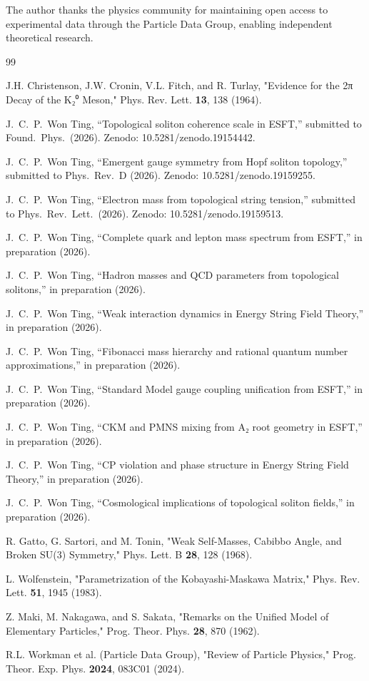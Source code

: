 ﻿\documentclass[prd,twocolumn,showpacs,superscriptaddress,groupedaddress]{revtex4-2}
\begin{document}
\begin{acknowledgments}
The author thanks the physics community for maintaining open access to experimental data through the Particle Data Group, enabling independent theoretical research.
\end{acknowledgments}

\begin{thebibliography}{99}

 J.H. Christenson, J.W. Cronin, V.L. Fitch, and R. Turlay, "Evidence for the 2π Decay of the K₂⁰ Meson," Phys. Rev. Lett. \textbf{13}, 138 (1964).

 J.~C.~P.~Won Ting, ``Topological soliton coherence scale in ESFT,'' submitted to Found.\ Phys.\ (2026). Zenodo: 10.5281/zenodo.19154442.

 J.~C.~P.~Won Ting, ``Emergent gauge symmetry from Hopf soliton topology,'' submitted to Phys.\ Rev.\ D (2026). Zenodo: 10.5281/zenodo.19159255.

 J.~C.~P.~Won Ting, ``Electron mass from topological string tension,'' submitted to Phys.\ Rev.\ Lett.\ (2026). Zenodo: 10.5281/zenodo.19159513.

 J.~C.~P.~Won Ting, ``Complete quark and lepton mass spectrum from ESFT,'' in preparation (2026).

 J.~C.~P.~Won Ting, ``Hadron masses and QCD parameters from topological solitons,'' in preparation (2026).

 J.~C.~P.~Won Ting, ``Weak interaction dynamics in Energy String Field Theory,'' in preparation (2026).

 J.~C.~P.~Won Ting, ``Fibonacci mass hierarchy and rational quantum number approximations,'' in preparation (2026).

 J.~C.~P.~Won Ting, ``Standard Model gauge coupling unification from ESFT,'' in preparation (2026).

 J.~C.~P.~Won Ting, ``CKM and PMNS mixing from A₂ root geometry in ESFT,'' in preparation (2026).

 J.~C.~P.~Won Ting, ``CP violation and phase structure in Energy String Field Theory,'' in preparation (2026).

 J.~C.~P.~Won Ting, ``Cosmological implications of topological soliton fields,'' in preparation (2026).

 R. Gatto, G. Sartori, and M. Tonin, "Weak Self-Masses, Cabibbo Angle, and Broken SU(3) Symmetry," Phys. Lett. B \textbf{28}, 128 (1968).

 L. Wolfenstein, "Parametrization of the Kobayashi-Maskawa Matrix," Phys. Rev. Lett. \textbf{51}, 1945 (1983).

 Z. Maki, M. Nakagawa, and S. Sakata, "Remarks on the Unified Model of Elementary Particles," Prog. Theor. Phys. \textbf{28}, 870 (1962).

 R.L. Workman et al. (Particle Data Group), "Review of Particle Physics," Prog. Theor. Exp. Phys. \textbf{2024}, 083C01 (2024).

\end{thebibliography}
\end{document}

